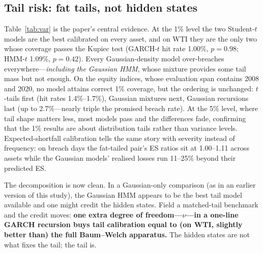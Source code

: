 \documentclass[11pt]{article}
\begin{document}
\subsection{Tail risk: fat tails, not hidden states}
Table~\ref{tab:var} is the paper's central evidence. At the 1\% level the
two Student-$t$ models are the best calibrated on every asset, and on WTI
they are the only two whose coverage passes the Kupiec test (GARCH-$t$
hit rate 1.00\%, $p=0.98$; HMM-$t$ 1.09\%, $p=0.42$). Every
Gaussian-density model over-breaches everywhere---\emph{including the
Gaussian HMM}, whose mixture provides some tail mass but not enough. On
the equity indices, whose evaluation span contains 2008 and 2020, no model
attains correct 1\% coverage, but the ordering is unchanged: $t$-tails
first (hit rates 1.4\%--1.7\%), Gaussian mixtures next, Gaussian
recursions last (up to 2.7\%---nearly triple the promised breach rate).
At the 5\% level, where tail shape matters less, most models pass and the
differences fade, confirming that the 1\% results are about distribution
tails rather than variance levels. Expected-shortfall calibration tells
the same story with severity instead of frequency: on breach days the
fat-tailed pair's ES ratios sit at 1.00--1.11 across assets while the
Gaussian models' realised losses run 11--25\% beyond their predicted ES.

The decomposition is now clean. In a Gaussian-only comparison (as in an
earlier version of this study), the Gaussian HMM appears to be the best
tail model available and one might credit the hidden states. Field a
matched-tail benchmark and the credit moves: \textbf{one extra degree of
freedom---$\nu$---in a one-line GARCH recursion buys tail calibration
equal to (on WTI, slightly better than) the full Baum--Welch apparatus.}
The hidden states are not what fixes the tail; the tail is.
\end{document}
